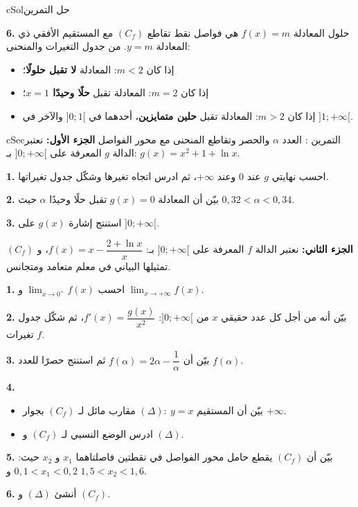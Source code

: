 \documentclass[12pt,a4paper]{article}
\newenvironment{BOX}[2]{\begin{otherlanguage}{english}\begin{arbox}{#1}{#2}}{\end{arbox}\end{otherlanguage}}
\newcounter{exo}
\newenvironment{tamrin}[1]{\stepcounter{exo}\begin{BOX}{cSec}{التمرين \theexo: #1}}{\end{BOX}}
\newenvironment{hal}{\Needspace{12\baselineskip}\begin{otherlanguage}{english}\begin{arbox}[breakable]{cSol}{حل التمرين \theexo}}{\end{arbox}\end{otherlanguage}}
\newenvironment{sq}{\begin{itemize}[leftmargin=2.4em,itemsep=3pt]}{\end{itemize}}
\newcommand{\qa}{\item[(أ)]}\newcommand{\qb}{\item[(ب)]}\newcommand{\qc}{\item[(جـ)]}\newcommand{\qd}{\item[(د)]}\newcommand{\qe}{\item[(هـ)]}
\newcommand{\QQ}[1]{\par\smallskip\textbf{#1.} }
\begin{document}
\begin{hal}
\QQ{6} حلول المعادلة $f(x)=m$ هي فواصل نقط تقاطع $(C_f)$ مع المستقيم الأفقي ذي المعادلة $y=m$. من جدول التغيرات والمنحنى:
\begin{itemize}
\item إذا كان $m<2$: المعادلة \textbf{لا تقبل حلولًا}؛
\item إذا كان $m=2$: المعادلة تقبل \textbf{حلًا وحيدًا $x=1$}؛
\item إذا كان $m>2$: المعادلة تقبل \textbf{حلين متمايزين}، أحدهما في $]0;1[$ والآخر في $]1;+\infty[$.
\end{itemize}
\end{hal}

\begin{tamrin}{العدد $\alpha$ والحصر وتقاطع المنحنى مع محور الفواصل}
\textbf{الجزء الأول:} نعتبر الدالة $g$ المعرفة على $]0;+\infty[$ بـ: $g(x)=x^2+1+\ln x$.
\QQ{1} احسب نهايتي $g$ عند $0$ وعند $+\infty$، ثم ادرس اتجاه تغيرها وشكّل جدول تغيراتها.
\QQ{2} بيّن أن المعادلة $g(x)=0$ تقبل حلًا وحيدًا $\alpha$ حيث $0{,}32<\alpha<0{,}34$.
\QQ{3} استنتج إشارة $g(x)$ على $]0;+\infty[$.

\textbf{الجزء الثاني:} نعتبر الدالة $f$ المعرفة على $]0;+\infty[$ بـ: $f(x)=x-\dfrac{2+\ln x}{x}$، و $(C_f)$ تمثيلها البياني في معلم متعامد ومتجانس.
\QQ{1} احسب $\displaystyle\lim_{x\to0^{+}}f(x)$ و $\displaystyle\lim_{x\to+\infty}f(x)$.
\QQ{2} بيّن أنه من أجل كل عدد حقيقي $x$ من $]0;+\infty[$: $f'(x)=\dfrac{g(x)}{x^2}$، ثم شكّل جدول تغيرات $f$.
\QQ{3} بيّن أن $f(\alpha)=2\alpha-\dfrac1\alpha$ ثم استنتج حصرًا للعدد $f(\alpha)$.
\QQ{4}
\begin{sq}
\qa بيّن أن المستقيم $(\Delta):\ y=x$ مقارب مائل لـ $(C_f)$ بجوار $+\infty$.
\qb ادرس الوضع النسبي لـ $(C_f)$ و $(\Delta)$.
\end{sq}
\QQ{5} بيّن أن $(C_f)$ يقطع حامل محور الفواصل في نقطتين فاصلتاهما $x_1$ و $x_2$ حيث: $0{,}1<x_1<0{,}2$ و $1{,}5<x_2<1{,}6$.
\QQ{6} أنشئ $(\Delta)$ و $(C_f)$.
\end{tamrin}
\end{document}
